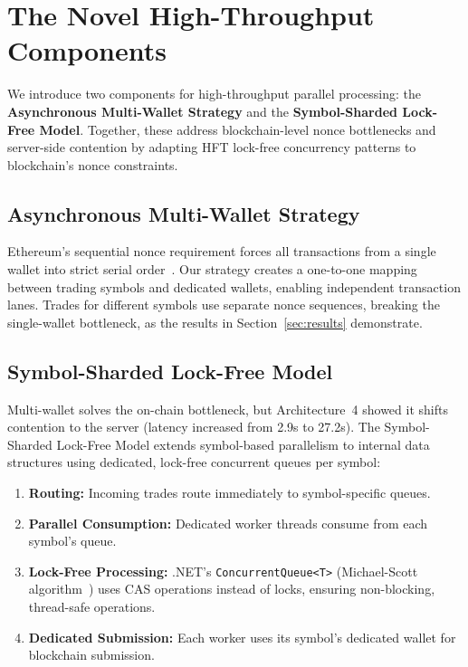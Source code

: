 \section{The Novel High-Throughput Components}
\label{sec:components}

We introduce two components for high-throughput parallel processing: the \textbf{Asynchronous Multi-Wallet Strategy} and the \textbf{Symbol-Sharded Lock-Free Model}. Together, these address blockchain-level nonce bottlenecks and server-side contention by adapting HFT lock-free concurrency patterns to blockchain's nonce constraints.

\subsection{Asynchronous Multi-Wallet Strategy}

Ethereum's sequential nonce requirement forces all transactions from a single wallet into strict serial order~\cite{wood2014yellowpaper}. Our strategy creates a one-to-one mapping between trading symbols and dedicated wallets, enabling independent transaction lanes. Trades for different symbols use separate nonce sequences, breaking the single-wallet bottleneck, as the results in Section~\ref{sec:results} demonstrate.

\subsection{Symbol-Sharded Lock-Free Model}

Multi-wallet solves the on-chain bottleneck, but Architecture~4 showed it shifts contention to the server (latency increased from 2.9s to 27.2s). The Symbol-Sharded Lock-Free Model extends symbol-based parallelism to internal data structures using dedicated, lock-free concurrent queues per symbol:

\begin{enumerate}
    \item \textbf{Routing:} Incoming trades route immediately to symbol-specific queues.
    \item \textbf{Parallel Consumption:} Dedicated worker threads consume from each symbol's queue.
    \item \textbf{Lock-Free Processing:} .NET's \texttt{ConcurrentQueue<T>} (Michael-Scott algorithm~\cite{michael1996lockfree}) uses CAS operations instead of locks, ensuring non-blocking, thread-safe operations.
    \item \textbf{Dedicated Submission:} Each worker uses its symbol's dedicated wallet for blockchain submission.
\end{enumerate}

